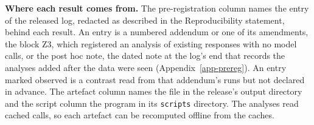 \begin{table}
\centering
\small
\caption{\textbf{Where each result comes from.} The pre-registration column names the
entry of the released log, redacted as described in the Reproducibility
statement, behind each result. An entry is a numbered addendum or one of its
amendments, the block Z3, which registered an analysis of existing responses
with no model calls, or the post hoc note, the dated note at the log's end
that records the analyses added after the data were seen
(Appendix~\ref{app-prereg}). An entry marked observed is a contrast read from
that addendum's runs but not declared in advance. The artefact column names the file in the
release's output directory and the script column the program in its
\texttt{scripts} directory. The analyses read cached calls, so each artefact
can be recomputed offline from the caches.}
\label{tab-app-provenance}

\end{table}
